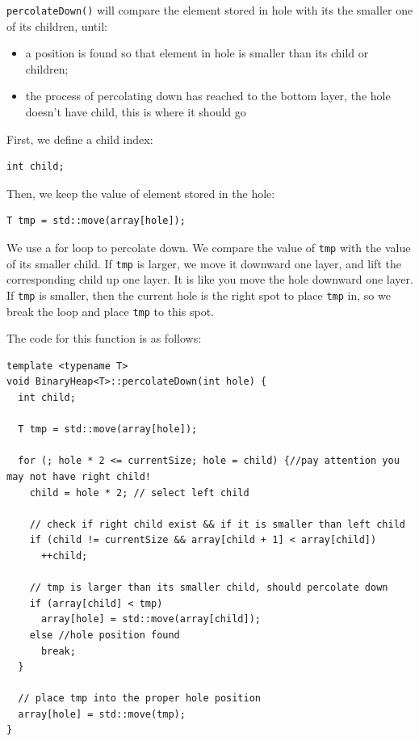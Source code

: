 \documentclass[12pt]{book}
\begin{document}
\texttt{percolateDown()} will compare the element stored in hole with its the smaller one of its children, until:
\begin{itemize}
\item a position is found so that element in hole is smaller than its child or children;
\item the process of percolating down has reached to the bottom layer, the hole doesn't have child, this is where it should go
\end{itemize}

First, we define a child index:
\begin{verbatim}
int child;
\end{verbatim}

Then, we keep the value of element stored in the hole:
\begin{verbatim}
T tmp = std::move(array[hole]);
\end{verbatim}

We use a for loop to percolate down. We compare the value of \texttt{tmp}  with the value of its smaller child. If \texttt{tmp} is larger, we move it downward one layer, and lift the corresponding child up one layer. It is like you move the hole downward one layer. If \texttt{tmp} is smaller, then the current hole is the right spot to place \texttt{tmp} in, so we break the loop and place \texttt{tmp} to this spot.

The code for this function is as follows:
\begin{verbatim}
template <typename T>
void BinaryHeap<T>::percolateDown(int hole) {
  int child;

  T tmp = std::move(array[hole]);

  for (; hole * 2 <= currentSize; hole = child) {//pay attention you may not have right child!
    child = hole * 2; // select left child

    // check if right child exist && if it is smaller than left child
    if (child != currentSize && array[child + 1] < array[child])
      ++child;

    // tmp is larger than its smaller child, should percolate down
    if (array[child] < tmp)
      array[hole] = std::move(array[child]);
    else //hole position found
      break; 
  }

  // place tmp into the proper hole position
  array[hole] = std::move(tmp);  
}
\end{verbatim}
\end{document}
